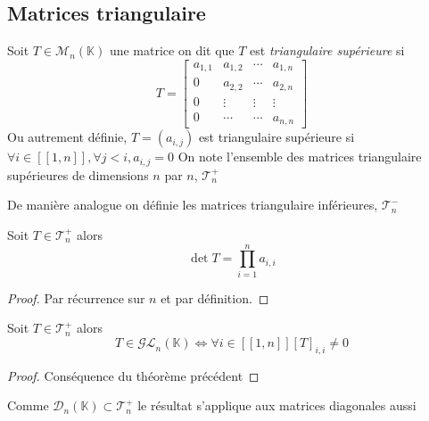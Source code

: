 \documentclass[11pt,colorlinks]{book}
\theoremstyle{mytheoremstyle}
\theoremstyle{mytheoremstyle}
\theoremstyle{mytheoremstyle}
\theoremstyle{mytheoremstyle}
\theoremstyle{mytheoremstyle}
\theoremstyle{mytheoremstyle}
\theoremstyle{mytheoremstyle}
\theoremstyle{mytheoremstyle}
\theoremstyle{myproblemstyle}
\def\mbb#1{\mathbb{#1}}
\def\mfc#1{\mathcal{#1}}
\def\bK{\mbb{K}}
\begin{document}
\subsection{Matrices triangulaire}
\begin{definition}
  Soit $T \in \mathcal{M}_n(\bK)$ une matrice on dit que $T$ est \textit{triangulaire supérieure} si 
  \begin{equation*}
    T = \begin{bmatrix}
      a_{1,1} & a_{1,2} & \cdots & a_{1,n} \\ 
      0 & a_{2,2} & \cdots & a_{2,n} \\ 
      0 & \vdots & \vdots & \vdots \\ 
      0 & \cdots & \cdots & a_{n,n}
    \end{bmatrix}
  \end{equation*}
  Ou autrement définie, $T = (a_{i,j})$ est triangulaire supérieure si $\forall i \in [\![1,n]\!], \forall j < i, a_{i,j} = 0$
  On note l'ensemble des matrices triangulaire supérieures de dimensions $n$ par $n$,  $\mathcal{T}^{+}_n$
  \end{definition}
  \begin{rmq}
    De manière analogue on définie les matrices triangulaire inférieures, $\mathcal T^{-}_n$
  \end{rmq}
  \begin{theorem}
    Soit $T \in \mathcal{T}^{+}_n$ alors 
    \begin{equation*}
      \det T = \prod_{i=1}^n a_{i,i}
    \end{equation*}
    \begin{proof}
      Par récurrence sur $n$ et par définition.
    \end{proof}
  \end{theorem}
  \begin{prop}
    Soit $T \in \mathcal{T}^{+}_n$ alors 
    \begin{equation*}
      T \in \mfc{GL}_n(\bK) \Leftrightarrow \forall i \in [\![1,n]\!] [T]_{i,i} \not= 0
    \end{equation*}
    \begin{proof}
      Conséquence du théorème précédent
    \end{proof}
  \end{prop}
  \begin{rmq}
    Comme $\mfc{D}_n(\bK) \subset \mfc{T}^{+}_n$ le résultat s'applique aux matrices diagonales aussi
  \end{rmq}
\end{document}
